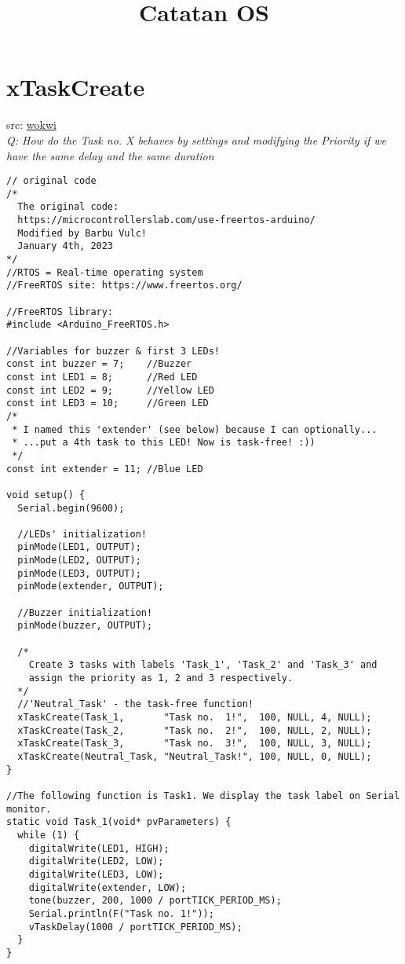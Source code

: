 \documentclass{article}
\title{Catatan OS}
\author{}
\date{}
\begin{document}
\maketitle

\section{xTaskCreate}
src:
\href{https://wokwi.com/projects/394200944712715265}{wokwi}\\
\textit{Q: How do the Task no. X behaves by settings and modifying the Priority if we have the same delay and the same duration}
\begin{lstlisting}[style=cpp]
// original code
/*
  The original code:
  https://microcontrollerslab.com/use-freertos-arduino/
  Modified by Barbu Vulc!
  January 4th, 2023
*/
//RTOS = Real-time operating system
//FreeRTOS site: https://www.freertos.org/

//FreeRTOS library:
#include <Arduino_FreeRTOS.h>

//Variables for buzzer & first 3 LEDs!
const int buzzer = 7;    //Buzzer
const int LED1 = 8;      //Red LED
const int LED2 = 9;      //Yellow LED
const int LED3 = 10;     //Green LED
/*
 * I named this 'extender' (see below) because I can optionally...
 * ...put a 4th task to this LED! Now is task-free! :))
 */
const int extender = 11; //Blue LED

void setup() {
  Serial.begin(9600);

  //LEDs' initialization!
  pinMode(LED1, OUTPUT);
  pinMode(LED2, OUTPUT);
  pinMode(LED3, OUTPUT);
  pinMode(extender, OUTPUT);

  //Buzzer initialization!
  pinMode(buzzer, OUTPUT);

  /*
    Create 3 tasks with labels 'Task_1', 'Task_2' and 'Task_3' and
    assign the priority as 1, 2 and 3 respectively.
  */
  //'Neutral_Task' - the task-free function!
  xTaskCreate(Task_1,       "Task no.  1!",  100, NULL, 4, NULL);
  xTaskCreate(Task_2,       "Task no.  2!",  100, NULL, 2, NULL);
  xTaskCreate(Task_3,       "Task no.  3!",  100, NULL, 3, NULL);
  xTaskCreate(Neutral_Task, "Neutral_Task!", 100, NULL, 0, NULL);
}

//The following function is Task1. We display the task label on Serial monitor.
static void Task_1(void* pvParameters) {
  while (1) {
    digitalWrite(LED1, HIGH);
    digitalWrite(LED2, LOW);
    digitalWrite(LED3, LOW);
    digitalWrite(extender, LOW);
    tone(buzzer, 200, 1000 / portTICK_PERIOD_MS);
    Serial.println(F("Task no. 1!"));
    vTaskDelay(1000 / portTICK_PERIOD_MS);
  }
}


\end{lstlisting}
\end{document}
